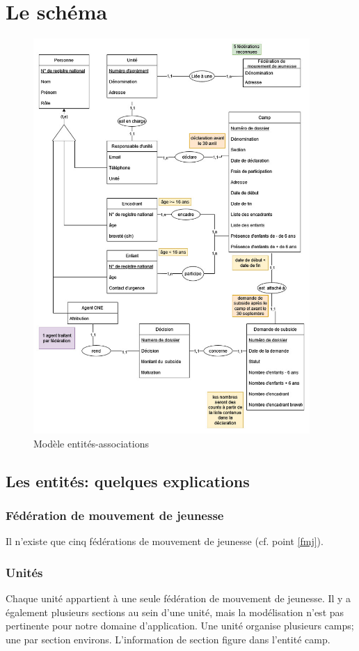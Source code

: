 \section{Le schéma}
\begin{figure}[H]
    \centering
    \includegraphics[height=15cm]{Pictures/modele_ea.jpg}
    \caption{Modèle entités-associations}
    \label{fig:modele_ea}
\end{figure}

\subsection{Les entités: quelques explications}

\subsubsection{Fédération de mouvement de jeunesse}
Il n'existe que cinq fédérations de mouvement de jeunesse (cf. point \ref{fmj}). 

\subsubsection{Unités}
Chaque unité appartient à une seule fédération de mouvement de jeunesse. Il y a également plusieurs sections au sein d'une unité, mais la modélisation n'est pas pertinente pour notre domaine d'application. Une unité organise plusieurs camps; une par section environs. L'information de section figure dans l'entité camp. 


